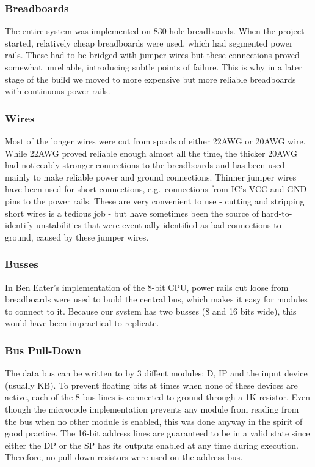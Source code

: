 \subsubsection{Breadboards}
The entire system was implemented on 830 hole breadboards. When the project started, relatively cheap breadboards were used, which had segmented power rails. These had to be bridged with jumper wires but these connections proved somewhat unreliable, introducing subtle points of failure. This is why in a later stage of the build we moved to more expensive but more reliable breadboards with continuous power rails.

\subsubsection{Wires} Most of the longer wires were cut from spools of either 22AWG or 20AWG wire. While 22AWG proved reliable enough almost all the time, the thicker 20AWG had noticeably stronger connections to the breadboards and has been used mainly to make reliable power and ground connections. Thinner jumper wires have been used for short connections, e.g.~connections from IC's VCC and GND pins to the power rails. These are very convenient to use - cutting and stripping short wires is a tedious job - but have sometimes been the source of hard-to-identify unstabilities that were eventually identified as bad connections to ground, caused by these jumper wires.

\subsubsection{Busses}
In Ben Eater's implementation of the 8-bit CPU, power rails cut loose from breadboards were used to build the central bus, which makes it easy for modules to connect to it. Because our system has two busses (8 and 16 bits wide), this would have been impractical to replicate.

\subsubsection{Bus Pull-Down}
The data bus can be written to by 3 diffent modules: D, IP and the input device (usually KB). To prevent floating bits at times when none of these devices are active, each of the 8 bus-lines is connected to ground through a 1K resistor. Even though the microcode implementation prevents any module from reading from the bus when no other module is enabled, this was done anyway in the spirit of good practice. The 16-bit address lines are guaranteed to be in a valid state since either the DP or the SP has its outputs enabled at any time during execution. Therefore, no pull-down resistors were used on the address bus.

